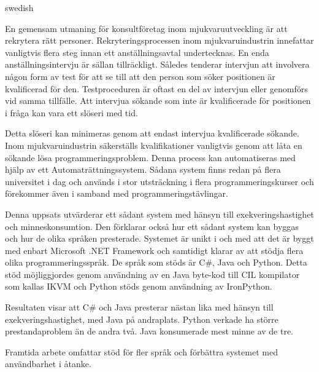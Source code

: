 \begin{foreignabstract}{swedish}

En gemensam utmaning för konsultföretag inom mjukvaruutveckling är att rekrytera rätt personer. Rekryteringsprocessen inom mjukvaruindustrin innefattar vanligtvis flera steg innan ett anställningsavtal undertecknas. En enda anställningsintervju är sällan tillräckligt. Således tenderar intervjun att involvera någon form av test för att se till att den person som söker positionen är kvalificerad för den. Testproceduren är oftast en del av intervjun eller genomförs vid samma tillfälle. Att intervjua sökande som inte är kvalificerade för positionen i fråga kan vara ett slöseri med tid.

Detta slöseri kan minimeras genom att endast intervjua kvalificerade sökande. Inom mjukvaruindustrin säkerställs kvalifikationer vanligtvis genom att låta en sökande lösa programmeringsproblem. Denna process kan automatiseras med hjälp av ett Automaträttningssystem. Sådana system finns redan på flera universitet i dag och används i stor utsträckning i flera programmeringskurser och förekommer även i samband med programmeringstävlingar.

Denna uppsats utvärderar ett sådant system med hänsyn till exekveringshastighet och minneskonsumtion. Den förklarar också hur ett sådant system kan byggas och hur de olika språken presterade. Systemet är unikt i och med att det är byggt med enbart Microsoft .NET Framework och samtidigt klarar av att stödja flera olika programmeringsspråk. De språk som stöds är C\#, Java och Python. Detta stöd möjliggjordes genom användning av en Java byte-kod till CIL kompilator som kallas IKVM och Python stöds genom användning av IronPython.

Resultaten visar att C\# och Java presterar nästan lika med hänsyn till exekveringshastighet, med Java på andraplats. Python verkade ha större prestandaproblem än de andra två. Java konsumerade mest minne av de tre.

Framtida arbete omfattar stöd för fler språk och förbättra systemet med användbarhet i åtanke.

\end{foreignabstract}